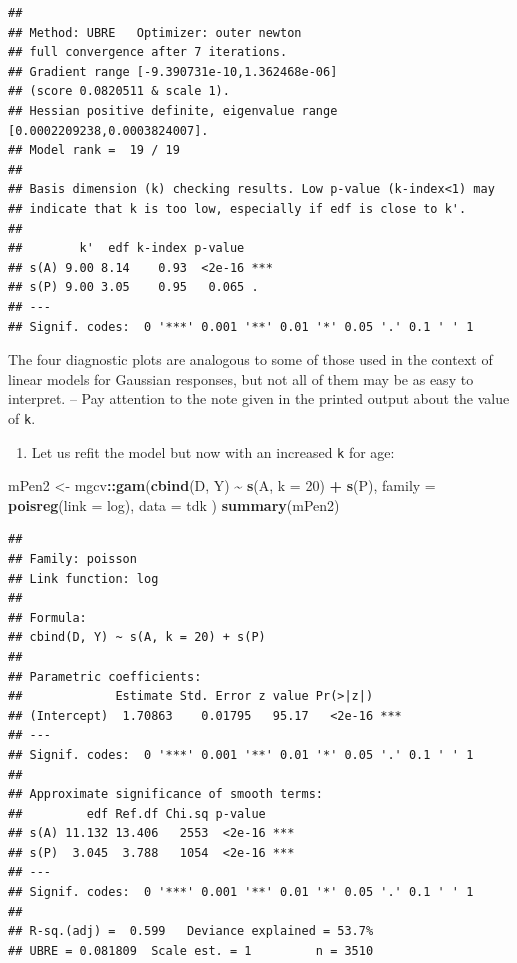 \documentclass[
]{book}
\newenvironment{Shaded}{\begin{snugshade}}{\end{snugshade}}
\newcommand{\AttributeTok}[1]{\textcolor[rgb]{0.13,0.29,0.53}{#1}}
\newcommand{\DecValTok}[1]{\textcolor[rgb]{0.00,0.00,0.81}{#1}}
\newcommand{\FunctionTok}[1]{\textcolor[rgb]{0.13,0.29,0.53}{\textbf{#1}}}
\newcommand{\NormalTok}[1]{#1}
\newcommand{\OtherTok}[1]{\textcolor[rgb]{0.56,0.35,0.01}{#1}}
\newcommand{\SpecialCharTok}[1]{\textcolor[rgb]{0.81,0.36,0.00}{\textbf{#1}}}
\providecommand{\tightlist}{%
  \setlength{\itemsep}{0pt}\setlength{\parskip}{0pt}}
\begin{document}
\begin{verbatim}
## 
## Method: UBRE   Optimizer: outer newton
## full convergence after 7 iterations.
## Gradient range [-9.390731e-10,1.362468e-06]
## (score 0.0820511 & scale 1).
## Hessian positive definite, eigenvalue range [0.0002209238,0.0003824007].
## Model rank =  19 / 19 
## 
## Basis dimension (k) checking results. Low p-value (k-index<1) may
## indicate that k is too low, especially if edf is close to k'.
## 
##        k'  edf k-index p-value    
## s(A) 9.00 8.14    0.93  <2e-16 ***
## s(P) 9.00 3.05    0.95   0.065 .  
## ---
## Signif. codes:  0 '***' 0.001 '**' 0.01 '*' 0.05 '.' 0.1 ' ' 1
\end{verbatim}

The four diagnostic plots are analogous to some of those used in
the context of linear models for Gaussian responses, but not all of them
may be as easy to interpret. -- Pay attention to the note
given in the printed output about the value of \texttt{k}.

\begin{enumerate}
\def\labelenumi{\arabic{enumi}.}
\setcounter{enumi}{3}
\tightlist
\item
  Let us refit the model but now with an increased \texttt{k} for age:
\end{enumerate}

\begin{Shaded}
\begin{Highlighting}[]
\NormalTok{mPen2 }\OtherTok{\textless{}{-}}\NormalTok{ mgcv}\SpecialCharTok{::}\FunctionTok{gam}\NormalTok{(}\FunctionTok{cbind}\NormalTok{(D, Y) }\SpecialCharTok{\textasciitilde{}} \FunctionTok{s}\NormalTok{(A, }\AttributeTok{k =} \DecValTok{20}\NormalTok{) }\SpecialCharTok{+} \FunctionTok{s}\NormalTok{(P),}
  \AttributeTok{family =} \FunctionTok{poisreg}\NormalTok{(}\AttributeTok{link =}\NormalTok{ log), }\AttributeTok{data =}\NormalTok{ tdk}
\NormalTok{)}
\FunctionTok{summary}\NormalTok{(mPen2)}
\end{Highlighting}
\end{Shaded}

\begin{verbatim}
## 
## Family: poisson 
## Link function: log 
## 
## Formula:
## cbind(D, Y) ~ s(A, k = 20) + s(P)
## 
## Parametric coefficients:
##             Estimate Std. Error z value Pr(>|z|)    
## (Intercept)  1.70863    0.01795   95.17   <2e-16 ***
## ---
## Signif. codes:  0 '***' 0.001 '**' 0.01 '*' 0.05 '.' 0.1 ' ' 1
## 
## Approximate significance of smooth terms:
##         edf Ref.df Chi.sq p-value    
## s(A) 11.132 13.406   2553  <2e-16 ***
## s(P)  3.045  3.788   1054  <2e-16 ***
## ---
## Signif. codes:  0 '***' 0.001 '**' 0.01 '*' 0.05 '.' 0.1 ' ' 1
## 
## R-sq.(adj) =  0.599   Deviance explained = 53.7%
## UBRE = 0.081809  Scale est. = 1         n = 3510
\end{verbatim}
\end{document}
